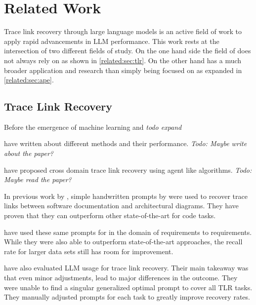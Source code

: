 \chapter{Related Work}
Trace link recovery through large language models is an active field of work to apply rapid advancements in LLM performance.
This work rests at the intersection of two different fields of study. On the one hand side the field of \TLR does not always rely on \LLMs as shown in \autoref{related:sec:tlr}. On the other hand \APE has a much broader application and research than simply being focused on \TLR as expanded in \autoref{related:sec:ape}.


\section{Trace Link Recovery}
\label{related:sec:tlr}

Before the emergence of machine learning and \LLMs \textit{todo expand}

 have written about different \IR methods and their performance. \textit{Todo: Maybe write about the paper?}


 have proposed cross domain trace link recovery using agent like algorithms. \textit{Todo: Maybe read the paper?}



In previous work by , simple handwritten prompts by  were used to recover trace links between software documentation and architectural diagrams. They have proven that they can outperform other state-of-the-art for code tasks. 

 have used these same prompts for \TLR in the domain of requirements to requirements. While they were also able to outperform state-of-the-art approaches, the recall rate for larger data sets still has room for improvement.

 have also evaluated LLM usage for trace link recovery. Their main takeaway was that even minor adjustments,  lead to major differences in the outcome. They were unable to find a singular generalized optimal prompt to cover all TLR tasks. They manually adjusted prompts for each task to greatly improve recovery rates.


